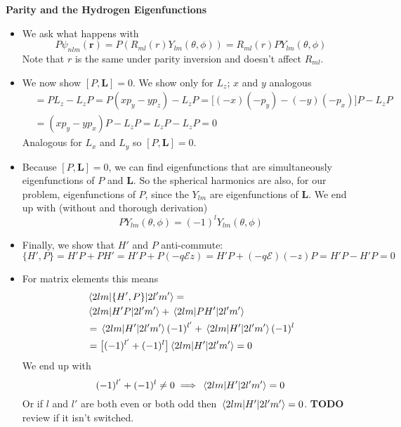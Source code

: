 \documentclass[11pt, a4paper]{article}
\renewcommand{\vec}[1]{\bm{#1}} %
\newcommand{\p}{\psi}  %
\renewcommand{\r}{\vec{r}}  %
\newcommand{\E}{\mathcal{E}}  %
\begin{document}
\textbf{Parity and the Hydrogen Eigenfunctions}
\begin{itemize}
	\item We ask what happens with
	\begin{equation*}
		P\p_{nlm}(\r) = P(R_{ml}(r)Y_{lm}(\theta, \phi)) = R_{ml}(r) P Y_{lm}(\theta, \phi)
	\end{equation*}
	Note that $ r $ is the same under parity inversion and doesn't affect $ R_{ml} $. 
	
	\item We now show $ [P, \vec{L}] = 0 $. We show only for $ L_{z} $; $ x $ and $ y $ analogous
	\begin{align*}
		[P, L_{z}] &= P L_{z} - L_{z}P = P(xp_{y} - yp_{z}) - L_{z}P = \big[(-x)(-p_{y}) - (-y)(-p_{x})\big]P - L_{z}P\\
		& = (xp_{y} - yp_{x})P - L_{z}P = L_{z}P - L_{z}P = 0
	\end{align*}
	Analogous for $ L_{x} $ and $ L_{y} $ so $ [P, \vec{L}] = 0 $. 
	
	\item Because $ [P, \vec{L}] = 0 $, we can find eigenfunctions that are simultaneously eigenfunctions of $ P $ and $ \vec{L} $. So the spherical harmonics are also, for our problem, eigenfunctions of $ P $, since the $ Y_{lm} $ are eigenfunctions of $ \vec{L} $. We end up with (without and thorough derivation)
	\begin{equation*}
		PY_{lm}(\theta, \phi) = (-1)^{l}Y_{lm}(\theta, \phi)
	\end{equation*}
	
	\item Finally, we show that $ H' $ and $ P $ anti-commute:
	\begin{equation*}
		\{H', P\} = H'P + PH' = H' P + P(-q \E z) = H' P + (-q\E)(-z)P  = H' P - H'P = 0
	\end{equation*}
	
	\item For matrix elements this means
	\begin{align*}
		& \mel{2lm}{\{H', P\}}{2l'm'} =\\
		 &\mel{2lm}{H' P}{2l'm'} + \mel{2lm}{PH'}{2l'm'}\\
		& = \mel{2lm}{H'}{2l'm'} (-1)^{l'} + \mel{2lm}{H'}{2l'm'}(-1)^{l}\\
		& = \big[(-1)^{l'} + (-1)^{l}\big]\mel{2lm}{H'}{2l'm'} = 0
	\end{align*}
	We end up with
	\begin{equation*}
		(-1)^{l'} + (-1)^{l} \neq 0 \implies \mel{2lm}{H'}{2l'm'} = 0
	\end{equation*}
	Or if $ l $ and $ l' $ are both even or both odd then $ \mel{2lm}{H'}{2l'm'} = 0 $. \textbf{TODO} review if it isn't switched. 
	
\end{itemize}
\end{document}
